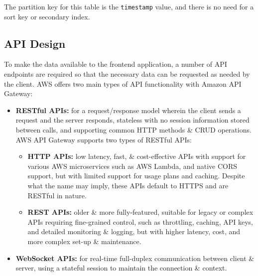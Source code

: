 \documentclass[a4paper,11pt]{report}
\begin{document}
The partition key for this table is the \verb|timestamp| value, and there is no need for a sort key or secondary index.

\subsection{API Design}
To make the data available to the frontend application, a number of API endpoints are required so that the necessary data can be requested as needed by the client.
AWS offers two main types of API functionality with Amazon API Gateway\supercite{awsapi}:
\begin{itemize}
    \item   \textbf{RESTful APIs:} for a request/response model wherein the client sends a request and the server responds, stateless with no session information stored between calls, and supporting common HTTP methods \& CRUD operations.
          AWS API Gateway supports two types of RESTful APIs\supercite{httpvsrest}:
          \begin{itemize}
              \item   \textbf{HTTP APIs:} low latency, fast, \& cost-effective APIs with support for various AWS microservices such as AWS Lambda, and native CORS support, but with limited support for usage plans and caching.
                      Despite what the name may imply, these APIs default to HTTPS and are RESTful in nature.
              \item   \textbf{REST APIs:} older \& more fully-featured, suitable for legacy or complex APIs requiring fine-grained control, such as throttling, caching, API keys, and detailed monitoring \& logging, but with higher latency, cost, and more complex set-up \& maintenance.
          \end{itemize}

    \item   \textbf{WebSocket APIs:} for real-time full-duplex communication between client \& server, using a stateful session to maintain the connection \& context.
\end{itemize}
\end{document}
